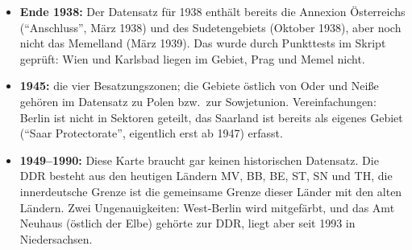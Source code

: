\begin{ausgabe}
\begin{passend}
%
\end{passend}
\end{ausgabe}


\begin{itemize}
	\item \textbf{Ende 1938:} Der Datensatz für 1938 enthält bereits die Annexion Österreichs (\enquote{Anschluss}, März 1938) und des Sudetengebiets (Oktober 1938), aber noch nicht das Memelland (März 1939). Das wurde durch Punkttests im Skript geprüft: Wien und Karlsbad liegen im Gebiet, Prag und Memel nicht.
	\item \textbf{1945:} die vier Besatzungszonen; die Gebiete östlich von Oder und Neiße gehören im Datensatz zu Polen bzw.\ zur Sowjetunion. Vereinfachungen: Berlin ist nicht in Sektoren geteilt, das Saarland ist bereits als eigenes Gebiet (\enquote{Saar Protectorate}, eigentlich erst ab 1947) erfasst.
	\item \textbf{1949--1990:} Diese Karte braucht gar keinen historischen Datensatz. Die DDR besteht aus den heutigen Ländern MV, BB, BE, ST, SN und TH, die innerdeutsche Grenze ist die gemeinsame Grenze dieser Länder mit den alten Ländern. Zwei Ungenauigkeiten: West-Berlin wird mitgefärbt, und das Amt Neuhaus (östlich der Elbe) gehörte zur DDR, liegt aber seit 1993 in Niedersachsen.
\end{itemize}

